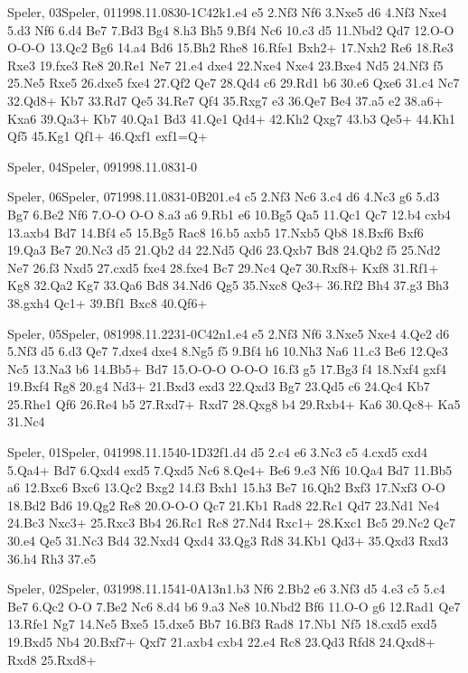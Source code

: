 \documentclass[twocolumn,a4paper,10pt]{report}
\begin{document}
\begin{chessgame}{Speler, 03}{Speler, 01}{1998.11.08}{3}{0-1}{C42k}{1.e4 e5 2.Nf3 Nf6 3.Nxe5 d6 4.Nf3 Nxe4 5.d3 Nf6 6.d4 Be7 7.Bd3 Bg4 8.h3 Bh5 9.Bf4 Nc6 10.c3 d5 11.Nbd2 Qd7 12.O-O O-O-O 13.Qc2 Bg6 14.a4 Bd6 15.Bh2 Rhe8 16.Rfe1 Bxh2+ 17.Nxh2 Re6 18.Re3 Rxe3 19.fxe3 Re8 20.Re1 Ne7 21.e4 dxe4 22.Nxe4 Nxe4 23.Bxe4 Nd5 24.Nf3 f5 25.Ne5 Rxe5 26.dxe5 fxe4 27.Qf2 Qe7 28.Qd4 c6 29.Rd1 b6 30.e6 Qxe6 31.c4 Nc7 32.Qd8+ Kb7 33.Rd7 Qe5 34.Re7 Qf4 35.Rxg7 e3 36.Qe7 Be4 37.a5 e2 38.a6+ Kxa6 39.Qa3+ Kb7 40.Qa1 Bd3 41.Qe1 Qd4+ 42.Kh2 Qxg7 43.b3 Qe5+ 44.Kh1 Qf5 45.Kg1 Qf1+ 46.Qxf1 exf1=Q+}\end{chessgame}
\begin{chessempty}{Speler, 04}{Speler, 09}{1998.11.08}{3}{1-0}{}\end{chessempty}
\begin{chessgame}{Speler, 06}{Speler, 07}{1998.11.08}{3}{1-0}{B20}{1.e4 c5 2.Nf3 Nc6 3.c4 d6 4.Nc3 g6 5.d3 Bg7 6.Be2 Nf6 7.O-O O-O 8.a3 a6 9.Rb1 e6 10.Bg5 Qa5 11.Qc1 Qc7 12.b4 cxb4 13.axb4 Bd7 14.Bf4 e5 15.Bg5 Rac8 16.b5 axb5 17.Nxb5 Qb8 18.Bxf6 Bxf6 19.Qa3 Be7 20.Nc3 d5 21.Qb2 d4 22.Nd5 Qd6 23.Qxb7 Bd8 24.Qb2 f5 25.Nd2 Ne7 26.f3 Nxd5 27.cxd5 fxe4 28.fxe4 Bc7 29.Nc4 Qe7 30.Rxf8+ Kxf8 31.Rf1+ Kg8 32.Qa2 Kg7 33.Qa6 Bd8 34.Nd6 Qg5 35.Nxc8 Qe3+ 36.Rf2 Bh4 37.g3 Bh3 38.gxh4 Qc1+ 39.Bf1 Bxc8 40.Qf6+}\end{chessgame}
\begin{chessgame}{Speler, 05}{Speler, 08}{1998.11.22}{3}{1-0}{C42n}{1.e4 e5 2.Nf3 Nf6 3.Nxe5 Nxe4 4.Qe2 d6 5.Nf3 d5 6.d3 Qe7 7.dxe4 dxe4 8.Ng5 f5 9.Bf4 h6 10.Nh3 Na6 11.c3 Be6 12.Qe3 Nc5 13.Na3 b6 14.Bb5+ Bd7 15.O-O-O O-O-O 16.f3 g5 17.Bg3 f4 18.Nxf4 gxf4 19.Bxf4 Rg8 20.g4 Nd3+ 21.Bxd3 exd3 22.Qxd3 Bg7 23.Qd5 c6 24.Qc4 Kb7 25.Rhe1 Qf6 26.Re4 b5 27.Rxd7+ Rxd7 28.Qxg8 b4 29.Rxb4+ Ka6 30.Qc8+ Ka5 31.Nc4\mate}\end{chessgame}
\begin{chessgame}{Speler, 01}{Speler, 04}{1998.11.15}{4}{0-1}{D32f}{1.d4 d5 2.c4 e6 3.Nc3 c5 4.cxd5 cxd4 5.Qa4+ Bd7 6.Qxd4 exd5 7.Qxd5 Nc6 8.Qe4+ Be6 9.e3 Nf6 10.Qa4 Bd7 11.Bb5 a6 12.Bxc6 Bxc6 13.Qc2 Bxg2 14.f3 Bxh1 15.h3 Be7 16.Qh2 Bxf3 17.Nxf3 O-O 18.Bd2 Bd6 19.Qg2 Re8 20.O-O-O Qc7 21.Kb1 Rad8 22.Rc1 Qd7 23.Nd1 Ne4 24.Bc3 Nxc3+ 25.Rxc3 Bb4 26.Rc1 Rc8 27.Nd4 Rxc1+ 28.Kxc1 Bc5 29.Nc2 Qc7 30.e4 Qe5 31.Nc3 Bd4 32.Nxd4 Qxd4 33.Qg3 Rd8 34.Kb1 Qd3+ 35.Qxd3 Rxd3 36.h4 Rh3 37.e5}\end{chessgame}
\begin{chessgame}{Speler, 02}{Speler, 03}{1998.11.15}{4}{1-0}{A13n}{1.b3 Nf6 2.Bb2 e6 3.Nf3 d5 4.e3 c5 5.c4 Be7 6.Qc2 O-O 7.Be2 Nc6 8.d4 b6 9.a3 Ne8 10.Nbd2 Bf6 11.O-O g6 12.Rad1 Qe7 13.Rfe1 Ng7 14.Ne5 Bxe5 15.dxe5 Bb7 16.Bf3 Rad8 17.Nb1 Nf5 18.cxd5 exd5 19.Bxd5 Nb4 20.Bxf7+ Qxf7 21.axb4 cxb4 22.e4 Rc8 23.Qd3 Rfd8 24.Qxd8+ Rxd8 25.Rxd8+}\end{chessgame}
\end{document}
